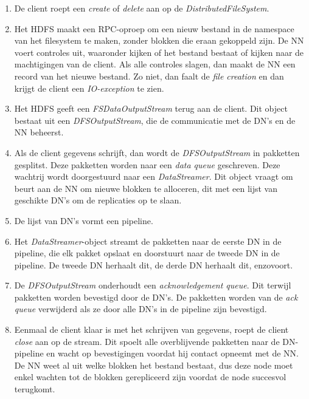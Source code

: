 \documentclass[a4paper,10pt,twoside]{report}
\begin{document}
\begin{enumerate}
	\item De client roept een \textit{create} of \textit{delete} aan op de \textit{DistributedFileSystem}.
	\item Het HDFS maakt een RPC-oproep om een nieuw bestand in de namespace van het filesystem te maken, zonder blokken die eraan gekoppeld zijn. De NN voert controles uit, waaronder kijken of het bestand bestaat of kijken naar de machtigingen van de client. Als alle controles slagen, dan maakt de NN een record van het nieuwe bestand. Zo niet, dan faalt de \textit{file creation} en dan krijgt de client een \textit{IO-exception} te zien.
	\item Het HDFS geeft een \textit{FSDataOutputStream} terug aan de client. Dit object bestaat uit een \textit{DFSOutputStream}, die de communicatie met de DN's en de NN beheerst.
	\item Als de client gegevens schrijft, dan wordt de \textit{DFSOutputStream} in pakketten gesplitst. Deze pakketten worden naar een \textit{data queue} geschreven. Deze wachtrij wordt doorgestuurd naar een \textit{DataStreamer}. Dit object vraagt om beurt aan de NN om nieuwe blokken te alloceren, dit met een lijst van geschikte DN's om de replicaties op te slaan.
	\item De lijst van DN's vormt een pipeline.
	\item Het \textit{DataStreamer}-object streamt de pakketten naar de eerste DN in de pipeline, die elk pakket opslaat en doorstuurt naar de tweede DN in de pipeline. De tweede DN herhaalt dit, de derde DN herhaalt dit, enzovoort.
	\item De \textit{DFSOutputStream} onderhoudt een \textit{acknowledgement queue}. Dit terwijl pakketten worden bevestigd door de DN's. De pakketten worden van de \textit{ack queue} verwijderd als ze door alle DN's in de pipeline zijn bevestigd.
	\item Eenmaal de client klaar is met het schrijven van gegevens, roept de client \textit{close} aan op de stream. Dit spoelt alle overblijvende pakketten naar de DN-pipeline en wacht op bevestigingen voordat hij contact opneemt met de NN. De NN weet al uit welke blokken het bestand bestaat, dus deze node moet enkel wachten tot de blokken gerepliceerd zijn voordat de node succesvol terugkomt.
\end{enumerate}
\end{document}
